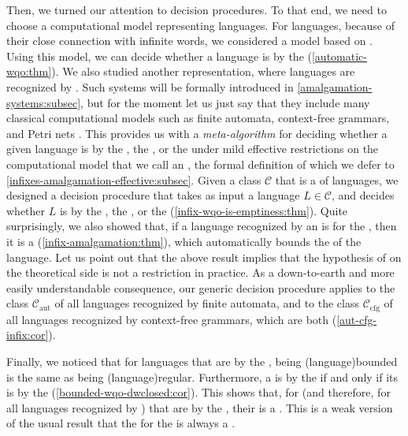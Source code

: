 Then, we turned our attention to decision procedures. To that end, we need to
choose a computational model representing languages. For 
languages, because of their close connection with infinite words, we considered
a model based on . Using this model, we can decide
whether a language is  by the 
(\cref{automatic-wqo:thm}). We also studied another representation, where
languages are recognized by  \cite{ASZZ24}. Such
systems will be formally introduced in \cref{amalgamation-systems:subsec}, but
for the moment let us just say that they include many classical computational
models such as finite automata, context-free grammars, and Petri nets
\cite{ASZZ24}. This provides us with a \emph{meta-algorithm} for deciding
whether a given language is  by the , the , or the  under mild
effective restrictions on the computational model that we call an , the formal definition of which we defer to
\cref{infixes-amalgamation-effective:subsec}. Given a class $\mathcal{C}$ that
is a  of languages, we designed a
decision procedure that takes as input a language $L \in \mathcal{C}$, and
decides whether $L$ is  by the , the
, or the 
(\cref{infix-wqo-is-emptiness:thm}). Quite surprisingly, we also showed that,
if a language recognized by an  is
 for the , then it is a  (\cref{infix-amalgamation:thm}), which automatically bounds the
 of the language. Let us point out that the above result
implies that the hypothesis of  on the theoretical side
is not a restriction in practice. As a down-to-earth and more easily
understandable consequence, our generic decision procedure applies to the class
$\mathcal{C}_\text{aut}$ of all languages recognized by finite automata, and to
the class $\mathcal{C}_\text{cfg}$ of all languages recognized by context-free
grammars, which are both 
(\cref{aut-cfg-infix:cor}).

Finally, we noticed that for  languages that are
 by the , being
\kl(language){bounded} is the same as being \kl(language){regular}.
Furthermore, a  is  by the
 if and only if its  is
 by the 
(\cref{bounded-wqo-dwclosed:cor}). This shows that, for 
(and therefore, for all languages recognized by ) that
are  by the , their  is a . This is a weak version of the usual result
that the  for the  is
always a .


